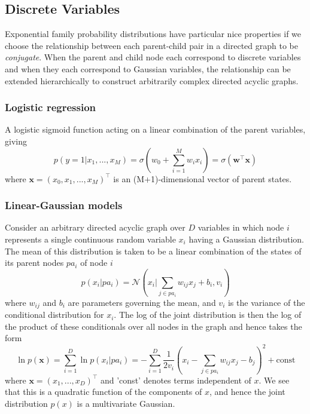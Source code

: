 \documentclass[a3paper, 12pt]{book} %
\begin{document}
\subsection{Discrete Variables}
Exponential family probability distributions have particular nice properties if we choose the relationship between each parent-child pair in a directed graph to be \emph{conjugate}. When the parent and child node each correspond to discrete variables and when they each correspond to Gaussian variables, the relationship can be extended hierarchically to construct arbitrarily complex directed acyclic graphs.

\subsubsection{Logistic regression}
A logistic sigmoid function acting on a linear combination of the parent variables, giving 
$$p(y=1|x_1,...,x_M)=\sigma{(w_0+\sum_{i=1}^{M}{w_ix_i})}=\sigma{(\mathbf{w}^{\top}\mathbf{x})}$$
where $\mathbf{x}=(x_0,x_1,...,x_M)^{\top}$ is an (M+1)-dimensional vector of parent states.
\subsubsection{Linear-Gaussian models}
Consider an arbitrary directed acyclic graph over $D$ variables in which node $i$
represents a single continuous random variable $x_i$ having a Gaussian distribution.
The mean of this distribution is taken to be a linear combination of the states of its
parent nodes $pa_i$ of node $i$
$$p(x_i|pa_i)=\mathcal{N}{(x_i|\sum_{j\in pa_i}{w_{ij}x_j+b_i, v_i})}$$
where $w_{ij}$ and $b_i$ are parameters governing the mean, and $v_i$ is the variance of the
conditional distribution for $x_i$. The log of the joint distribution is then the log of the
product of these conditionals over all nodes in the graph and hence takes the form
$$\ln p{(\mathbf{x})}=\sum_{i=1}^{D}{\ln p(x_i|pa_i)}=-\sum_{i=1}^{D}{\frac{1}{2v_i}(x_i-\sum_{j \in pa_i}{w_{ij}x_j-b_j})^2 + \mathrm{const}}$$
where $\mathbf{x} = (x_1,..., x_D)^\top$ and 'const' denotes terms independent of $x$. We see that
this is a quadratic function of the components of $x$, and hence the joint distribution $p(x)$ is a multivariate Gaussian. 
\end{document}
